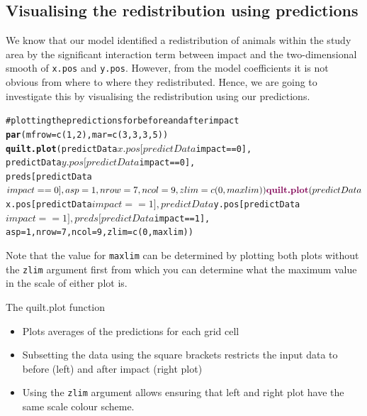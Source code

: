 \documentclass[11pt, a4paper]{article}
\makeatletter
\newcommand{\hlfunctioncall}[1]{\textcolor[rgb]{0.501960784313725,0,0.329411764705882}{\textbf{#1}}}%
\newcommand{\hlcomment}[1]{\textcolor[rgb]{0.180392156862745,0.6,0.341176470588235}{#1}}%
\newenvironment{kframe}{%
 \def\at@end@of@kframe{}%
 \ifinner\ifhmode%
  \def\at@end@of@kframe{\end{minipage}}%
  \begin{minipage}{\columnwidth}%
 \fi\fi%
 \def\FrameCommand##1{\hskip\@totalleftmargin \hskip-\fboxsep
 \colorbox{shadecolor}{##1}\hskip-\fboxsep
     \hskip-\linewidth \hskip-\@totalleftmargin \hskip\columnwidth}%
 \MakeFramed {\advance\hsize-\width
   \@totalleftmargin\z@ \linewidth\hsize
   \@setminipage}}%
 {\par\unskip\endMakeFramed%
 \at@end@of@kframe}
\newenvironment{knitrout}{}{} %
\makeatother
\begin{document}
\subsection{Visualising the redistribution using predictions}
\noindent We know that our model identified a redistribution of animals within the study area by the significant interaction term between impact and the two-dimensional smooth of {\tt x.pos} and {\tt y.pos}. However, from the model coefficients it is not obvious from where to where they redistributed. Hence, we are going to investigate this by visualising the redistribution using our predictions. 
\begin{knitrout}\footnotesize
{}\color{fgcolor}\begin{kframe}
\begin{alltt}
\hlcomment{# plotting the predictions for before and after impact}
\hlfunctioncall{par}(mfrow=c(1,2), mar=c(3,3,3,5))
\hlfunctioncall{quilt.plot}(predictData$x.pos[predictData$impact==0], 
predictData$y.pos[predictData$impact==0], 
preds[predictData$impact==0], asp=1, nrow=7, ncol=9, 
zlim=c(0, maxlim))
\hlfunctioncall{quilt.plot}(predictData$x.pos[predictData$impact==1], 
predictData$y.pos[predictData$impact==1], preds[predictData$impact==1], 
asp=1,nrow=7, ncol=9, zlim=c(0, maxlim))
\end{alltt}
\end{kframe}
\end{knitrout}
\noindent Note that the value for {\tt maxlim} can be determined by plotting both plots without the {\tt zlim} argument first from which you can determine what the maximum value in the scale of either plot is. 
\begin{block}{The quilt.plot function}
\begin{itemize}
\item{Plots averages of the predictions for each grid cell}
\item{Subsetting the data using the square brackets restricts the input data to before (left) and after impact (right plot)}
\item{Using the {\tt zlim} argument allows ensuring that left and right plot have the same scale colour scheme. }
\end{itemize}
\end{block}
\end{document}
